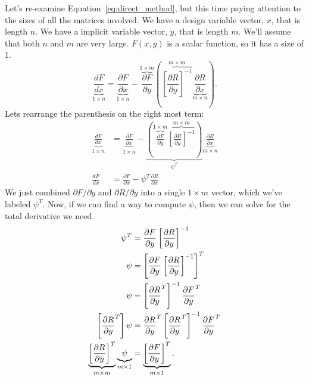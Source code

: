 \documentclass[conf]{new-aiaa}
\begin{document}
    Let's re-examine Equation~\eqref{eq:direct_method}, but this time paying attention to the sizes of all the matrices involved. 
    We have a design variable vector, $x$, that is length $n$. 
    We have a implicit variable vector, $y$, that is length $m$. 
    We'll assume that both $n$ and $m$ are very large. 
    $F(x,y)$ is a scalar function, so it has a size of 1. 
    \begin{equation}
    \underbrace{\frac{d F}{d x}}_{1 \times n} = 
    \underbrace{\frac{\partial F}{\partial x}}_{1 \times n} - 
    \overbrace{\frac{\partial F}{\partial y}}^{1 \times m} 
    \left( \overbrace{\left[\frac{\partial R}{\partial y}\right]^{-1}}^{m \times m} 
    \underbrace{\frac{\partial R}{\partial x}}_{m \times n} \right).
    \end{equation}
    Lets rearrange the parenthesis on the right most term: 
    \begin{align}
    \underbrace{\frac{d F}{d x}}_{1 \times n} &= 
    \underbrace{\frac{\partial F}{\partial x}}_{1 \times n} - 
    \underbrace{ \left( \overbrace{\frac{\partial F}{\partial y}}^{1 \times m} 
    \overbrace{\left[\frac{\partial R}{\partial y}\right]^{-1}}^{m \times m} \right)}_{\psi^T}
    \underbrace{\frac{\partial R}{\partial x}}_{m \times n} \\
    \frac{d F}{d x} &= \frac{\partial F}{\partial x} - \psi^T\frac{\partial R}{\partial x}
    \end{align}
    We just combined $\partial F/\partial y$ and $\partial R/ \partial y$ into a single $1 \times m$ vector, which we've labeled $\psi^T$. 
    Now, if we can find a way to compute $\psi$, then we can solve for the total derivative we need. 
    \begin{align}
    \psi^T &=  \frac{\partial F}{\partial y} \left[\frac{\partial R}{\partial y}\right]^{-1}\notag\\
    \psi &=  \left[\frac{\partial F}{\partial y} \left[\frac{\partial R}{\partial y}\right]^{-1}\right]^T \notag\\
    \psi &=  \left[\frac{\partial R}{\partial y}^T\right]^{-1} \frac{\partial F}{\partial y}^T \notag\\
    \left[\frac{\partial R}{\partial y}^T\right]\psi &= \frac{\partial R}{\partial y}^T \left[\frac{\partial R}{\partial y}^T\right]^{-1} \frac{\partial F}{\partial y}^T \notag\\
    \underbrace{\left[\frac{\partial R}{\partial y}\right]^{T}}_{m \times m} \underbrace{\psi}_{m \times 1} &=  \underbrace{\left[\frac{\partial F}{\partial y}\right]^{T}}_{m \times 1}. \label{eq:linear_adjoint}
    \end{align}
\end{document}
